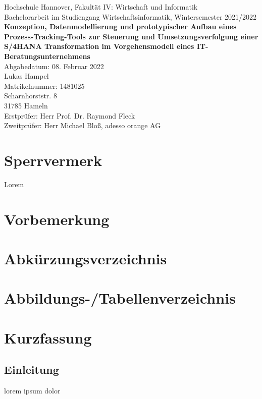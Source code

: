 \documentclass[12pt, titlepage]{article}
\begin{document}
\newpage\null\thispagestyle{empty}\newpage

\begin{titlepage}
    \normalsize{Hochschule Hannover, Fakultät IV: Wirtschaft und Informatik \\
    Bachelorarbeit im Studiengang Wirtschaftsinformatik, Wintersemester 2021/2022} 
    \vspace{1.5cm}
    \sloppy 
    \textbf{\Large{\\Konzeption, Datenmodellierung und prototypischer Aufbau eines Prozess-Tracking-Tools zur Steuerung und Umsetzungsverfolgung einer S/4HANA Transformation im Vorgehensmodell eines IT-Beratungsunternehmens}}
    \vspace{10cm}
    \normalsize{\\Abgabedatum: 08. Februar 2022 \vspace{1cm}\\Lukas Hampel\\Matrikelnummer: 1481025\\Scharnhorststr. 8\\31785 Hameln\vspace{1cm}\\Erstprüfer: Herr Prof. Dr. Raymond Fleck\\Zweitprüfer: Herr Michael Bloß, adesso orange AG
    }
\end{titlepage}

\section*{Sperrvermerk}
Lorem
\newpage


\setcounter{page}{3}
\section*{Vorbemerkung}

\newpage

\tableofcontents

\newpage

\section*{Abkürzungsverzeichnis}

\newpage

\section*{Abbildungs-/Tabellenverzeichnis}

\newpage

\section*{Kurzfassung}

\newpage

\setcounter{page}{1}
\begin{normalsize}
\linespread{1.5}
\section{Einleitung}

lorem ipsum dolor








\end{normalsize}
\end{document}

